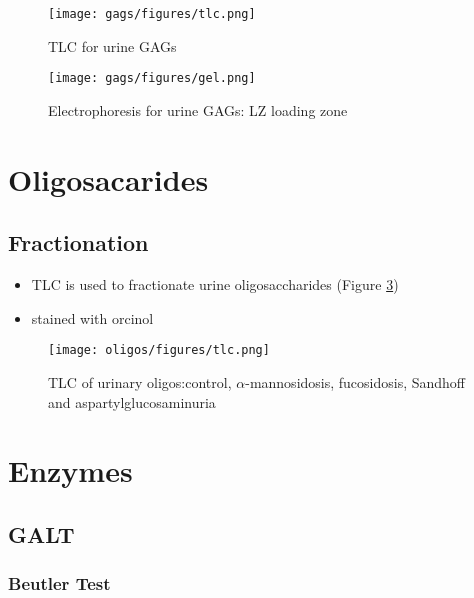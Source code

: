 \documentclass[12pt]{scrartcl}
\begin{document}
\begin{figure}[htbp]
\centering
\texttt{[image: gags/figures/tlc.png]}
\caption{\label{fig:orgdef9993}TLC for urine GAGs}
\end{figure}


\begin{figure}[htbp]
\centering
\texttt{[image: gags/figures/gel.png]}
\caption{\label{fig:orga504493}Electrophoresis for urine GAGs: LZ loading zone}
\end{figure}
\section{Oligosacarides}
\label{sec:org20e4f07}
\subsection{Fractionation}
\label{sec:orgdc1454e}
\begin{itemize}
\item TLC is used to fractionate urine oligosaccharides (Figure \ref{fig:org237a919})
\item stained with orcinol
\end{itemize}

\begin{figure}[htbp]
\centering
\texttt{[image: oligos/figures/tlc.png]}
\caption{\label{fig:org237a919}TLC of urinary oligos:control, \(\alpha\)-mannosidosis, fucosidosis, Sandhoff and aspartylglucosaminuria}
\end{figure}
\section{Enzymes}
\label{sec:orgff9b980}
\subsection{GALT}
\label{sec:orgc2da3d0}
\subsubsection{Beutler Test}
\label{sec:org75d85c0}




\end{document}
